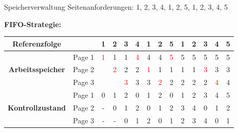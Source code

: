 \begin{example}{Speicherverwaltung}
    Seitenanforderungen: 1, 2, 3, 4, 1, 2, 5, 1, 2, 3, 4, 5

    \textbf{FIFO-Strategie:}

    \begin{tabular}{|c|c|c|c|c|c|c|c|c|c|c|c|c|c|}
        \hline
        \multicolumn{1}{|c}{\textbf{Referenzfolge}} & \multicolumn{1}{c|}{} & 1                  & 2                  & 3                  & 4                  & 1                  & 2                  & 5                  & 1 & 2 & 3                  & 4                  & 5 \\
        \hline
        \hline
        \multirow{3}{*}{\textbf{Arbeitsspeicher}}   & Page 1                & \textcolor{red}{1} & 1                  & 1                  & \textcolor{red}{4} & 4                  & 4                  & \textcolor{red}{5} & 5 & 5 & 5                  & 5                  & 5 \\
                                                    & Page 2                &                    & \textcolor{red}{2} & 2                  & 2                  & \textcolor{red}{1} & 1                  & 1                  & 1 & 1 & \textcolor{red}{3} & 3                  & 3 \\
                                                    & Page 3                &                    &                    & \textcolor{red}{3} & 3                  & 3                  & \textcolor{red}{2} & 2                  & 2 & 2 & 2                  & \textcolor{red}{4} & 4 \\
        \hline
        \hline
        \multirow{3}{*}{\textbf{Kontrollzustand}}   & Page 1                & 0                  & 1                  & 2                  & 0                  & 1                  & 2                  & 0                  & 1 & 2 & 3                  & 4                  & 5 \\
                                                    & Page 2                & -                  & 0                  & 1                  & 2                  & 0                  & 1                  & 2                  & 3 & 4 & 0                  & 1                  & 2 \\
                                                    & Page 3                & -                  & -                  & 0                  & 1                  & 2                  & 0                  & 1                  & 2 & 3 & 4                  & 0                  & 1 \\
        \hline
    \end{tabular}


\end{example}
